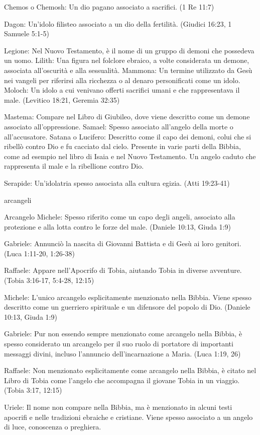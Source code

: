 \documentclass[12pt,a4paper,twoside,openany]{book}
\begin{document}
Chemos o Chemosh: Un dio pagano associato a sacrifici. (1 Re 11:7)


Dagon: Un'idolo filisteo associato a un dio della fertilità. (Giudici 16:23, 1 Samuele 5:1-5)


Legione: Nel Nuovo Testamento, è il nome di un gruppo di demoni che possedeva un uomo.
Lilith: Una figura nel folclore ebraico, a volte considerata un demone, associata all'oscurità e alla sessualità.
Mammona: Un termine utilizzato da Gesù nei vangeli per riferirsi alla ricchezza o al denaro personificati come un idolo.
Moloch: Un idolo a cui venivano offerti sacrifici umani e che rappresentava il male. (Levitico 18:21, Geremia 32:35)


Mastema: Compare nel Libro di Giubileo, dove viene descritto come un demone associato all'oppressione.
Samael: Spesso associato all'angelo della morte o all'accusatore.
Satana o Lucifero: Descritto come il capo dei demoni, colui che si ribellò contro Dio e fu cacciato dal cielo. Presente in varie parti della Bibbia, come ad esempio nel libro di Isaia e nel Nuovo Testamento. Un angelo caduto che rappresenta il male e la ribellione contro Dio.

Serapide: Un'idolatria spesso associata alla cultura egizia. (Atti 19:23-41)


arcangeli


Arcangelo Michele: Spesso riferito come un capo degli angeli, associato alla protezione e alla lotta contro le forze del male. (Daniele 10:13, Giuda 1:9)

Gabriele: Annunciò la nascita di Giovanni Battista e di Gesù ai loro genitori. (Luca 1:11-20, 1:26-38)

Raffaele: Appare nell'Apocrifo di Tobia, aiutando Tobia in diverse avventure. (Tobia 3:16-17, 5:4-28, 12:15)


Michele: L'unico arcangelo esplicitamente menzionato nella Bibbia. Viene spesso descritto come un guerriero spirituale e un difensore del popolo di Dio. (Daniele 10:13, Giuda 1:9)

Gabriele: Pur non essendo sempre menzionato come arcangelo nella Bibbia, è spesso considerato un arcangelo per il suo ruolo di portatore di importanti messaggi divini, incluso l'annuncio dell'incarnazione a Maria. (Luca 1:19, 26)

Raffaele: Non menzionato esplicitamente come arcangelo nella Bibbia, è citato nel Libro di Tobia come l'angelo che accompagna il giovane Tobia in un viaggio. (Tobia 3:17, 12:15)

Uriele: Il nome non compare nella Bibbia, ma è menzionato in alcuni testi apocrifi e nelle tradizioni ebraiche e cristiane. Viene spesso associato a un angelo di luce, conoscenza o preghiera.
\end{document}
